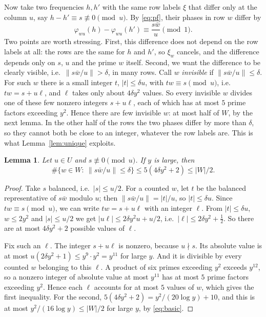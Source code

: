 \documentclass[11pt]{amsart}
\newtheorem{lemma}[theorem]{Lemma}
\theoremstyle{definition}
\theoremstyle{remark}
\newcommand{\nint}[1]{\lVert #1\rVert}
\begin{document}
Now take two frequencies $h,h'$ with the same row labels $\xi$ that differ only at the column $u$, say $h-h'\equiv s\not\equiv0\pmod u$. By \eqref{eq:pf}, their phases in row $w$ differ by
\[
 \varphi_{wu}(h)-\varphi_{wu}(h')\equiv\frac{s\bar w}{u}\pmod1 .
\]
Two points are worth stressing. First, this difference does not depend on the row labels at all: the rows are the same for $h$ and $h'$, so $\xi_w$ cancels, and the difference depends only on $s$, $u$ and the prime $w$ itself. Second, we want the difference to be clearly visible, i.e.\ $\nint{s\bar w/u}>\delta$, in many rows. Call $w$ \emph{invisible} if $\nint{s\bar w/u}\le\delta$. For such $w$ there is a small integer $t$, $|t|\le\delta u$, with $tw\equiv s\pmod u$, i.e.\ $tw=s+u\ell$, and $\ell$ takes only about $4\delta y^2$ values. So every invisible $w$ divides one of these few nonzero integers $s+u\ell$, each of which has at most $5$ prime factors exceeding $y^2$. Hence there are few invisible $w$: at most half of $W$, by the next lemma. In the other half of the rows the two phases differ by more than $\delta$, so they cannot both be close to an integer, whatever the row labels are. This is what Lemma~\ref{lem:unique} exploits.


\begin{lemma}\label{lem:count}
Let $u\in U$ and $s\not\equiv0\pmod u$. If $y$ is large, then
\[
 \#\{w\in W:\ \nint{s\bar w/u}\le\delta\}\le 5(4\delta y^2+2)\le |W|/2 .
\]
\end{lemma}
\begin{proof}
Take $s$ balanced, i.e.\ $|s|\le u/2$. For a counted $w$, let $t$ be the balanced representative of $s\bar w$ modulo $u$; then $\nint{s\bar w/u}=|t|/u$, so $|t|\le\delta u$. Since $tw\equiv s\pmod u$, we can write $tw=s+u\ell$ with an integer $\ell$. From $|t|\le\delta u$, $w\le2y^2$ and $|s|\le u/2$ we get $|u\ell|\le2\delta y^2u+u/2$, i.e.\ $|\ell|\le2\delta y^2+\frac12$. So there are at most $4\delta y^2+2$ possible values of $\ell$.

Fix such an $\ell$. The integer $s+u\ell$ is nonzero, because $u\nmid s$. Its absolute value is at most $u(2\delta y^2+1)\le y^9\cdot y^2=y^{11}$ for large $y$. And it is divisible by every counted $w$ belonging to this $\ell$. A product of six primes exceeding $y^2$ exceeds $y^{12}$, so a nonzero integer of absolute value at most $y^{11}$ has at most $5$ prime factors exceeding $y^2$. Hence each $\ell$ accounts for at most $5$ values of $w$, which gives the first inequality. For the second, $5(4\delta y^2+2)=y^2/(20\log y)+10$, and this is at most $y^2/(16\log y)\le|W|/2$ for large $y$, by \eqref{eq:basic}.
\end{proof}
\end{document}
